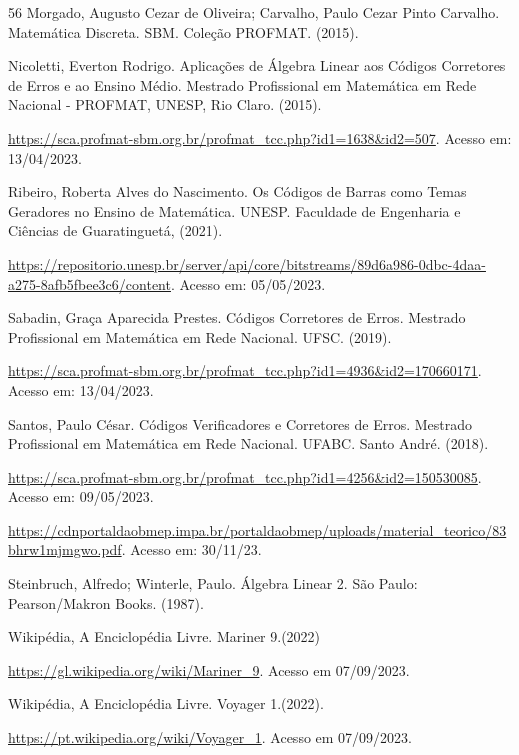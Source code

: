 \documentclass[oneside,a4paper,12pt]{book}
\theoremstyle{plain}
\begin{document}
\begin{thebibliography}{56}
 Morgado, Augusto Cezar de Oliveira; Carvalho, Paulo Cezar Pinto Carvalho. Matemática Discreta. SBM. Coleção PROFMAT. (2015).


 Nicoletti, Everton Rodrigo. Aplicações de Álgebra Linear aos Códigos Corretores de Erros e ao Ensino Médio. Mestrado Profissional em Matemática em Rede Nacional - PROFMAT, UNESP, Rio Claro. (2015).

\url{https://sca.profmat-sbm.org.br/profmat_tcc.php?id1=1638&id2=507}. Acesso em: 13/04/2023.

 Ribeiro, Roberta Alves do Nascimento. Os Códigos de Barras como Temas Geradores no Ensino de Matemática. UNESP. Faculdade de Engenharia e Ciências de Guaratinguetá, (2021). 

\url{https://repositorio.unesp.br/server/api/core/bitstreams/89d6a986-0dbc-4daa-a275-8afb5fbee3c6/content}. Acesso em: 05/05/2023.

 Sabadin, Graça Aparecida Prestes. Códigos Corretores de Erros. Mestrado Profissional em Matemática em Rede Nacional. UFSC. (2019).

\url{https://sca.profmat-sbm.org.br/profmat_tcc.php?id1=4936&id2=170660171}. Acesso em: 13/04/2023.

 Santos, Paulo César. Códigos Verificadores e  Corretores de Erros. Mestrado Profissional em Matemática em Rede Nacional. UFABC. Santo André. (2018).

\url{https://sca.profmat-sbm.org.br/profmat_tcc.php?id1=4256&id2=150530085}. Acesso em: 09/05/2023.


 \url{https://cdnportaldaobmep.impa.br/portaldaobmep/uploads/material_teorico/83bhrw1mjmgwo.pdf}. Acesso em: 30/11/23.
 
 Steinbruch, Alfredo; Winterle, Paulo. Álgebra Linear 2. São Paulo: Pearson/Makron Books. (1987).

 Wikipédia, A Enciclopédia Livre. Mariner 9.(2022)

\url{https://gl.wikipedia.org/wiki/Mariner_9}. Acesso em 07/09/2023.

 Wikipédia, A Enciclopédia Livre. Voyager 1.(2022).

\url{https://pt.wikipedia.org/wiki/Voyager_1}. Acesso em 07/09/2023.


\end{thebibliography}







              
\end{document}
